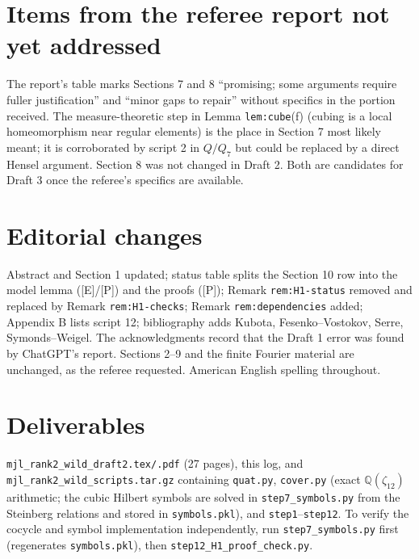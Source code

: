 \documentclass[11pt]{article}
\newcommand{\Q}{\mathbb Q}
\begin{document}
\section*{Items from the referee report not yet addressed}
The report's table marks Sections 7 and 8 ``promising; some arguments
require fuller justification'' and ``minor gaps to repair'' without
specifics in the portion received.  The measure-theoretic step in
Lemma \texttt{lem:cube}(f) (cubing is a local homeomorphism near regular
elements) is the place in Section 7 most likely meant; it is
corroborated by script 2 in $Q/Q_7$ but could be replaced by a direct
Hensel argument.  Section 8 was not changed in Draft 2.  Both are
candidates for Draft 3 once the referee's specifics are available.

\section*{Editorial changes}
Abstract and Section 1 updated; status table splits the Section 10 row
into the model lemma ([E]/[P]) and the proofs ([P]); Remark
\texttt{rem:H1-status} removed and replaced by Remark
\texttt{rem:H1-checks}; Remark \texttt{rem:dependencies} added;
Appendix B lists script 12; bibliography adds Kubota, Fesenko--Vostokov,
Serre, Symonds--Weigel.  The acknowledgments record that the Draft 1
error was found by ChatGPT's report.  Sections 2--9 and the finite
Fourier material are unchanged, as the referee requested.  American
English spelling throughout.

\section*{Deliverables}
\texttt{mjl\_rank2\_wild\_draft2.tex/.pdf} (27 pages), this log, and
\texttt{mjl\_rank2\_wild\_scripts.tar.gz} containing \texttt{quat.py},
\texttt{cover.py} (exact $\Q(\zeta_{12})$ arithmetic; the cubic Hilbert
symbols are solved in \texttt{step7\_symbols.py} from the Steinberg
relations and stored in \texttt{symbols.pkl}), and
\texttt{step1}--\texttt{step12}.  To verify the cocycle and symbol
implementation independently, run \texttt{step7\_symbols.py} first
(regenerates \texttt{symbols.pkl}), then \texttt{step12\_H1\_proof\_check.py}.
\end{document}
